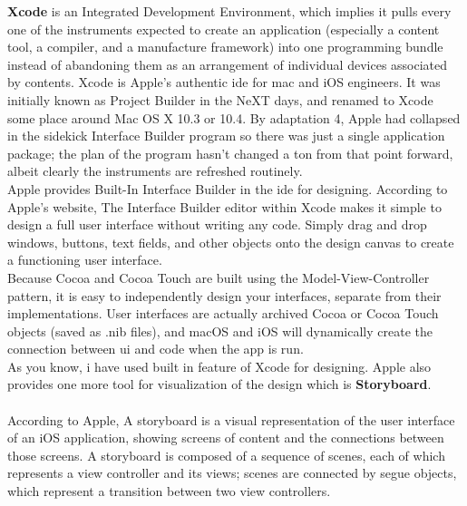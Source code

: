 \textbf{Xcode} is an Integrated Development Environment, which implies it pulls every one of the instruments expected to create an application (especially a content tool, a compiler, and a manufacture framework) into one programming bundle instead of abandoning them as an arrangement of individual devices associated by contents. Xcode is Apple's authentic \gls{ide} for \gls{mac} and \gls{iOS} engineers. It was initially known as Project Builder in the NeXT days, and renamed to Xcode some place around Mac OS X 10.3 or 10.4. By adaptation 4, Apple had collapsed in the sidekick Interface Builder program so there was just a single application package; the plan of the program hasn't changed a ton from that point forward, albeit clearly the instruments are refreshed routinely. \\


Apple provides Built-In Interface Builder in the \gls{ide} for designing.
According to Apple's website, The Interface Builder editor within Xcode makes it simple to design a full user interface without writing any code. Simply drag and drop windows, buttons, text fields, and other objects onto the design canvas to create a functioning user interface. \\

Because Cocoa and Cocoa Touch are built using the Model-View-Controller pattern, it is easy to independently design your interfaces, separate from their implementations. User interfaces are actually archived Cocoa or Cocoa Touch objects (saved as .nib files), and \gls{macOS} and \gls{iOS} will dynamically create the connection between \gls{ui} and code when the app is run. \\

As you know, i have used built in feature of Xcode for designing. Apple also provides one more tool for visualization of the design which is \textbf{Storyboard}. \\ \\
According to Apple, A storyboard is a visual representation of the user interface of an \gls{iOS} application, showing screens of content and the connections between those screens. A storyboard is composed of a sequence of scenes, each of which represents a view controller and its views; scenes are connected by segue objects, which represent a transition between two view controllers. \\

